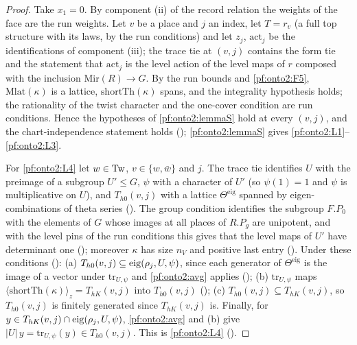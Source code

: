 \begin{proof}
Take $x_1=0$. By component (ii) of the record relation the weights of the face are the run weights. Let $v$ be a place and $j$
an index, let $T=r_v$ (a full top structure with its laws, by the run conditions) and let $z_j$, $\mathrm{act}_j$
be the identifications of component (iii); the trace tie at $(v,j)$ contains the form tie and the statement that
$\mathrm{act}_j$ is the level action of the level maps of $r$ composed with the inclusion $\mathrm{Mir}(R)\to G$. By the run bounds
and \ref{pf:onto2:F5}, $\mathrm{Mlat}(\kappa)$ is a lattice, $\mathrm{shortTh}(\kappa)$ spans, and the integrality hypothesis holds;
the rationality of the twist character and the one-cover condition are run conditions. Hence the hypotheses of
\cref{pf:onto2:lemmaS} hold at every $(v,j)$, and the chart-independence statement holds
(); \cref{pf:onto2:lemmaS} gives \ref{pf:onto2:L1}--\ref{pf:onto2:L3}.

For \ref{pf:onto2:L4} let $w\in\mathrm{Tw}$, $v\in\{w,\bar w\}$ and $j$. The trace tie identifies $U$ with the preimage of a subgroup
$U'\le G$, $\psi$ with a character of $U'$ (so $\psi(1)=1$ and $\psi$ is multiplicative on $U$), and $T_{h0}(v,j)$ with a lattice
$\Theta^{\mathrm{eig}}$ spanned by eigen-combinations of theta series (). The group
condition identifies the subgroup $F.P_0$ with the elements of $G$ whose images at all places of $R.P_g$ are unipotent, and with the
level pins of the run conditions this gives that the level maps of $U'$ have determinant one
(); moreover $\kappa$ has size $n_V$ and positive last entry
(). Under these conditions
(): (a) $T_{h0}(v,j)\subseteq\operatorname{eig}(\rho_j,U,\psi)$, since each generator of
$\Theta^{\mathrm{eig}}$ is the image of a vector under $\mathrm{tr}_{U,\psi}$ and \cref{pf:onto2:avg} applies
(); (b) $\mathrm{tr}_{U,\psi}$ maps $\langle\mathrm{shortTh}(\kappa)\rangle_z=T_{hK}(v,j)$
into $T_{h0}(v,j)$ (); (c) $T_{h0}(v,j)\subseteq T_{hK}(v,j)$, so $T_{h0}(v,j)$
is finitely generated since $T_{hK}(v,j)$ is. Finally, for $y\in T_{hK}(v,j)\cap\operatorname{eig}(\rho_j,U,\psi)$, \cref{pf:onto2:avg} and (b)
give $|U|\,y=\mathrm{tr}_{U,\psi}(y)\in T_{h0}(v,j)$. This is \ref{pf:onto2:L4}
().
\end{proof}

